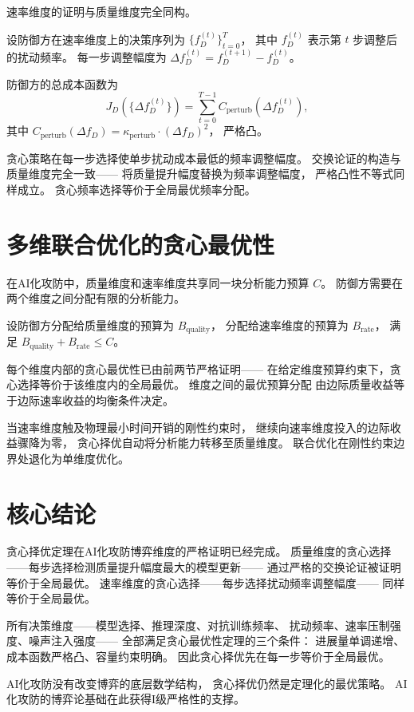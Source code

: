 \documentclass[11pt,a4paper]{article}
\begin{document}
速率维度的证明与质量维度完全同构。

设防御方在速率维度上的决策序列为 \(\{f_D^{(t)}\}_{t=0}^{T}\)，
其中 \(f_D^{(t)}\) 表示第 \(t\) 步调整后的扰动频率。
每一步调整幅度为 \(\Delta f_D^{(t)} = f_D^{(t+1)} - f_D^{(t)}\)。

防御方的总成本函数为
\[
J_D(\{\Delta f_D^{(t)}\}) = \sum_{t=0}^{T-1} C_{\text{perturb}}(\Delta f_D^{(t)}),
\]
其中 \(C_{\text{perturb}}(\Delta f_D) = \kappa_{\text{perturb}} \cdot (\Delta f_D)^2\)，
严格凸。

贪心策略在每一步选择使单步扰动成本最低的频率调整幅度。
交换论证的构造与质量维度完全一致——
将质量提升幅度替换为频率调整幅度，
严格凸性不等式同样成立。
贪心频率选择等价于全局最优频率分配。

\section{多维联合优化的贪心最优性}

在AI化攻防中，质量维度和速率维度共享同一块分析能力预算 \(C\)。
防御方需要在两个维度之间分配有限的分析能力。

设防御方分配给质量维度的预算为 \(B_{\text{quality}}\)，
分配给速率维度的预算为 \(B_{\text{rate}}\)，
满足 \(B_{\text{quality}} + B_{\text{rate}} \le C\)。

每个维度内部的贪心最优性已由前两节严格证明——
在给定维度预算约束下，贪心选择等价于该维度内的全局最优。
维度之间的最优预算分配
由边际质量收益等于边际速率收益的均衡条件决定。

当速率维度触及物理最小时间开销的刚性约束时，
继续向速率维度投入的边际收益骤降为零，
贪心择优自动将分析能力转移至质量维度。
联合优化在刚性约束边界处退化为单维度优化。

\section{核心结论}

贪心择优定理在AI化攻防博弈维度的严格证明已经完成。
质量维度的贪心选择——每步选择检测质量提升幅度最大的模型更新——
通过严格的交换论证被证明等价于全局最优。
速率维度的贪心选择——每步选择扰动频率调整幅度——
同样等价于全局最优。

所有决策维度——模型选择、推理深度、对抗训练频率、
扰动频率、速率压制强度、噪声注入强度——
全部满足贪心最优性定理的三个条件：
进展量单调递增、成本函数严格凸、容量约束明确。
因此贪心择优先在每一步等价于全局最优。

AI化攻防没有改变博弈的底层数学结构，
贪心择优仍然是定理化的最优策略。
AI化攻防的博弈论基础在此获得I级严格性的支撑。
\end{document}
